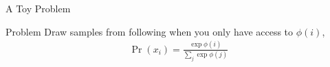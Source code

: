 


\begin{frame}{A Toy Problem}
  \begin{alertblock}{Problem}
      Draw samples from following when you only have access to $\phi(i)$,
      \begin{align}
        \Pr(x_i) = \frac{\exp\phi(i)}{\sum_j\exp\phi(j)} \tag{$i \in [k]$}
      \end{align}
  \end{alertblock}
\end{frame}

